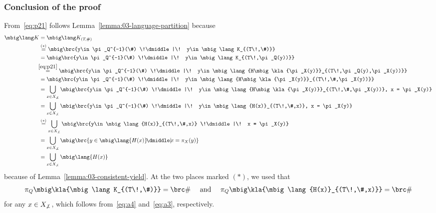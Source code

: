 \subsubsection*{Conclusion of the proof}

From~\eqref{eq:p21} follows Lemma~\ref{lemma:03-language-partition} because
\begin{align*}
 \mbig\lang K
 &= \mbig\lang K_{(T\!,\#)} \\
 &\overset{(*)}= \mbig\brc{y\in \pi_Q^{-1}(\#) \!\dmiddle|\! y\in\mbig\lang K_{(T\!,\#)}} \\
 &= \mbig\brc{y\in \pi_Q^{-1}(\#) \!\dmiddle|\! y\in\mbig\lang K_{(T\!,\pi_Q(y))}} \\
 &\hspace*{-0.4em}\overset{\eqref{eq:p21}}= \mbig\brc{y\in \pi_Q^{-1}(\#) \!\dmiddle|\! y\in\mbig\lang{H\mbig\kla{\pi_X(y)}}_{(T\!,\pi_Q(y),\pi_X(y))}} \\
 &= \mbig\brc{y\in \pi_Q^{-1}(\#) \!\dmiddle|\! y\in\mbig\lang{H\mbig\kla{\pi_X(y)}}_{(T\!,\#,\pi_X(y))}} \\
 &= \bigcup_{x\in X_{\not\bot}} \mbig\brc{y\in \pi_Q^{-1}(\#) \!\dmiddle|\! y\in\mbig\lang{H\mbig\kla{\pi_X(y)}}_{(T\!,\#,\pi_X(y))}, x = \pi_X(y)} \\
 &= \bigcup_{x\in X_{\not\bot}} \mbig\brc{y\in \pi_Q^{-1}(\#) \!\dmiddle|\! y\in\mbig\lang{H(x)}_{(T\!,\#,x)}, x = \pi_X(y)} \\
 &\overset{(*)}= \bigcup_{x\in X_{\not\bot}} \mbig\brc{y\in \mbig\lang{H(x)}_{(T\!,\#,x)} \!\dmiddle|\! x = \pi_X(y)} \\
 &= \bigcup_{x\in X_{\not\bot}} \mbig\brc{y\in \mbig\lang{H(x)} \!\dmiddle|\! x = \pi_X(y)} \\
 &= \bigcup_{x\in X_{\not\bot}} \mbig\lang{H(x)}
\end{align*}
because of Lemma~\ref{lemma:03-consistent-yield}. At the two places marked $(*)$, we used that
\[
 \pi_Q\mbig\kla{\mbig\lang K_{(T\!,\#)}} = \brc\#
 \quad\text{ and }\quad
 \pi_Q\mbig\kla{\mbig\lang{H(x)}_{(T\!,\#,x)}} = \brc\#
\]
for any $x\in X_{\not\bot}$, which follows from~\eqref{eq:a4} and~\eqref{eq:a3}, respectively.
